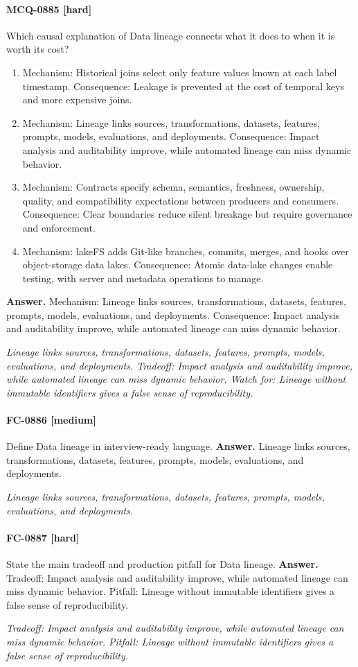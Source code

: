 \paragraph{MCQ-0885 [hard]} Which causal explanation of Data lineage connects what it does to when it is worth its cost?
\begin{enumerate}[label=\Alph*.]
\item Mechanism: Historical joins select only feature values known at each label timestamp. Consequence: Leakage is prevented at the cost of temporal keys and more expensive joins.
\item Mechanism: Lineage links sources, transformations, datasets, features, prompts, models, evaluations, and deployments. Consequence: Impact analysis and auditability improve, while automated lineage can miss dynamic behavior.
\item Mechanism: Contracts specify schema, semantics, freshness, ownership, quality, and compatibility expectations between producers and consumers. Consequence: Clear boundaries reduce silent breakage but require governance and enforcement.
\item Mechanism: lakeFS adds Git-like branches, commits, merges, and hooks over object-storage data lakes. Consequence: Atomic data-lake changes enable testing, with server and metadata operations to manage.
\end{enumerate}
\noindent\textbf{Answer.} Mechanism: Lineage links sources, transformations, datasets, features, prompts, models, evaluations, and deployments. Consequence: Impact analysis and auditability improve, while automated lineage can miss dynamic behavior.
\par\textit{Lineage links sources, transformations, datasets, features, prompts, models, evaluations, and deployments. Tradeoff: Impact analysis and auditability improve, while automated lineage can miss dynamic behavior. Watch for: Lineage without immutable identifiers gives a false sense of reproducibility.}
\paragraph{FC-0886 [medium]} Define Data lineage in interview-ready language.
\noindent\textbf{Answer.} Lineage links sources, transformations, datasets, features, prompts, models, evaluations, and deployments.
\par\textit{Lineage links sources, transformations, datasets, features, prompts, models, evaluations, and deployments.}
\paragraph{FC-0887 [hard]} State the main tradeoff and production pitfall for Data lineage.
\noindent\textbf{Answer.} Tradeoff: Impact analysis and auditability improve, while automated lineage can miss dynamic behavior. Pitfall: Lineage without immutable identifiers gives a false sense of reproducibility.
\par\textit{Tradeoff: Impact analysis and auditability improve, while automated lineage can miss dynamic behavior. Pitfall: Lineage without immutable identifiers gives a false sense of reproducibility.}
